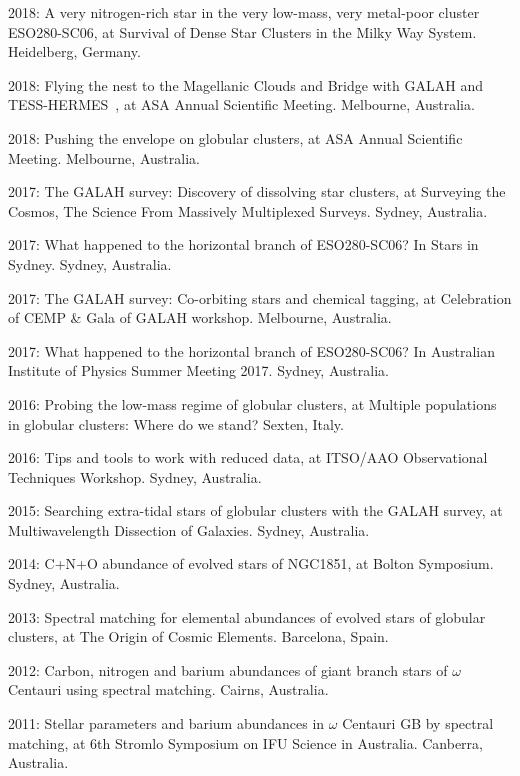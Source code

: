 \item[{\color{numcolor}\scriptsize14}] 2018: A very nitrogen-rich star in the very low-mass, very metal-poor cluster ESO280-SC06, at Survival of Dense Star Clusters in the Milky Way System. Heidelberg, Germany.
\item[{\color{numcolor}\scriptsize13}] 2018: Flying the nest to the Magellanic Clouds and Bridge with GALAH and TESS-HERMES~, at  ASA Annual Scientific Meeting. Melbourne, Australia.
\item[{\color{numcolor}\scriptsize12}] 2018: Pushing the envelope on globular clusters, at  ASA Annual Scientific Meeting. Melbourne, Australia.
\item[{\color{numcolor}\scriptsize11}] 2017: The GALAH survey: Discovery of dissolving star clusters, at  Surveying the Cosmos, The Science From Massively Multiplexed Surveys. Sydney, Australia.
\item[{\color{numcolor}\scriptsize10}] 2017: What happened to the horizontal branch of ESO280-SC06? In Stars in Sydney. Sydney, Australia.
\item[{\color{numcolor}\scriptsize9}] 2017: The GALAH survey: Co-orbiting stars and chemical tagging, at  Celebration of CEMP \& Gala of GALAH workshop. Melbourne, Australia.
\item[{\color{numcolor}\scriptsize8}] 2017: What happened to the horizontal branch of ESO280-SC06? In Australian Institute of Physics Summer Meeting 2017. Sydney, Australia.
\item[{\color{numcolor}\scriptsize7}] 2016: Probing the low-mass regime of globular clusters, at  Multiple populations in globular clusters: Where do we stand? Sexten, Italy.
\item[{\color{numcolor}\scriptsize6}] 2016: Tips and tools to work with reduced data, at  ITSO/AAO Observational Techniques Workshop. Sydney, Australia.
\item[{\color{numcolor}\scriptsize5}] 2015: Searching extra-tidal stars of globular clusters with the GALAH survey, at  Multiwavelength Dissection of Galaxies. Sydney, Australia.
\item[{\color{numcolor}\scriptsize4}] 2014: C+N+O abundance of evolved stars of NGC1851, at  Bolton Symposium. Sydney, Australia.
\item[{\color{numcolor}\scriptsize3}] 2013: Spectral matching for elemental abundances of evolved stars of globular clusters, at  The Origin of Cosmic Elements. Barcelona, Spain.
\item[{\color{numcolor}\scriptsize2}] 2012: Carbon, nitrogen and barium abundances of giant branch stars of $\omega$ Centauri using spectral matching. Cairns, Australia.
\item[{\color{numcolor}\scriptsize1}] 2011: Stellar parameters and barium abundances in $\omega$ Centauri GB by spectral matching, at  6th Stromlo Symposium on IFU Science in Australia. Canberra, Australia.
